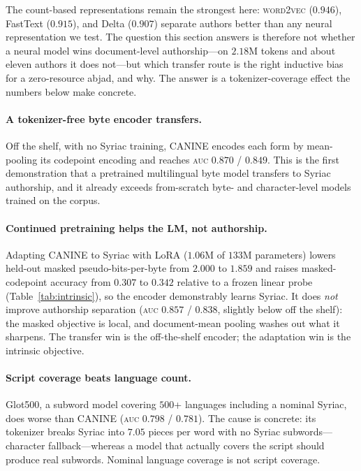\documentclass[11pt]{article}
\newcommand{\auc}{\textsc{auc}}
\begin{document}
The count-based representations remain the strongest here: \textsc{word2vec}
($0.946$), FastText ($0.915$), and Delta ($0.907$) separate authors better than any
neural representation we test. The question this section answers is therefore not
whether a neural model wins document-level authorship---on $2.18$M tokens and about
eleven authors it does not---but which transfer route is the right inductive bias
for a zero-resource abjad, and why. The answer is a tokenizer-coverage effect the
numbers below make concrete.

\paragraph{A tokenizer-free byte encoder transfers.}
Off the shelf, with no Syriac training, CANINE encodes each form by mean-pooling
its codepoint encoding and reaches \auc{} $0.870$ / $0.849$. This is the first
demonstration that a pretrained multilingual byte model transfers to Syriac
authorship, and it already exceeds from-scratch byte- and character-level models
trained on the corpus.

\paragraph{Continued pretraining helps the LM, not authorship.}
Adapting CANINE to Syriac with LoRA ($1.06$M of $133$M parameters) lowers held-out
masked pseudo-bits-per-byte from $2.000$ to $1.859$ and raises masked-codepoint
accuracy from $0.307$ to $0.342$ relative to a frozen linear probe
(Table~\ref{tab:intrinsic}), so the encoder demonstrably learns Syriac. It does
\emph{not} improve authorship separation (\auc{} $0.857$ / $0.838$, slightly below
off the shelf): the masked objective is local, and document-mean pooling washes out
what it sharpens. The transfer win is the off-the-shelf encoder; the adaptation win
is the intrinsic objective.

\paragraph{Script coverage beats language count.}
Glot500, a subword model covering $500$+ languages including a nominal Syriac, does
worse than CANINE (\auc{} $0.798$ / $0.781$). The cause is concrete: its tokenizer
breaks Syriac into $7.05$ pieces per word with no Syriac subwords---character
fallback---whereas a model that actually covers the script should produce real
subwords. Nominal language coverage is not script coverage.
\end{document}
